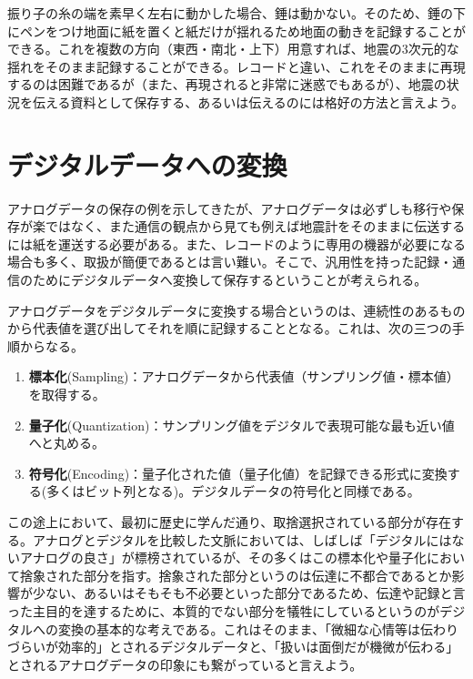 振り子の糸の端を素早く左右に動かした場合、錘は動かない。そのため、錘の下にペンをつけ地面に紙を置くと紙だけが揺れるため地面の動きを記録することができる。これを複数の方向（東西・南北・上下）用意すれば、地震の3次元的な揺れをそのまま記録することができる。レコードと違い、これをそのままに再現するのは困難であるが（また、再現されると非常に迷惑でもあるが）、地震の状況を伝える資料として保存する、あるいは伝えるのには格好の方法と言えよう。


\section{デジタルデータへの変換}

アナログデータの保存の例を示してきたが、アナログデータは必ずしも移行や保存が楽ではなく、また通信の観点から見ても例えば地震計をそのままに伝送するには紙を運送する必要がある。また、レコードのように専用の機器が必要になる場合も多く、取扱が簡便であるとは言い難い。そこで、汎用性を持った記録・通信のためにデジタルデータへ変換して保存するということが考えられる。

アナログデータをデジタルデータに変換する場合というのは、連続性のあるものから代表値を選び出してそれを順に記録することとなる。これは、次の三つの手順からなる。
\begin{enumerate}
\item \textbf{標本化}(Sampling)：アナログデータから代表値（サンプリング値・標本値）を取得する。
\item \textbf{量子化}(Quantization)：サンプリング値をデジタルで表現可能な最も近い値へと丸める。
\item \textbf{符号化}(Encoding)：量子化された値（量子化値）を記録できる形式に変換する(多くはビット列となる)。デジタルデータの符号化と同様である。
\end{enumerate}

この途上において、最初に歴史に学んだ通り、取捨選択されている部分が存在する。アナログとデジタルを比較した文脈においては、しばしば「デジタルにはないアナログの良さ」が標榜されているが、その多くはこの標本化や量子化において捨象された部分を指す。捨象された部分というのは伝達に不都合であるとか影響が少ない、あるいはそもそも不必要といった部分であるため、伝達や記録と言った主目的を達するために、本質的でない部分を犠牲にしているというのがデジタルへの変換の基本的な考えである。これはそのまま、「微細な心情等は伝わりづらいが効率的」とされるデジタルデータと、「扱いは面倒だが機微が伝わる」とされるアナログデータの印象にも繋がっていると言えよう。

